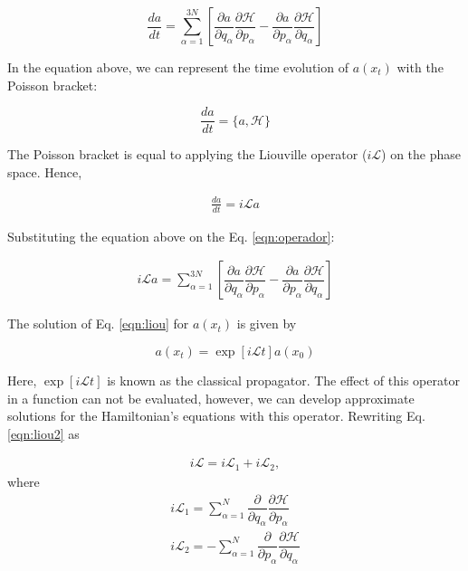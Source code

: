 \begin{equation}
\frac{da}{dt} = \sum_{\alpha=1}^{3N} \left [ \dfrac{\partial a}{\partial q_{\alpha}} \dfrac{\partial \mathcal{H}}{\partial p_{\alpha}}  - \dfrac{\partial a}{\partial p_{\alpha}} \dfrac{\partial \mathcal{H}}{\partial q_{\alpha}} \right]
\label{eqn:operador}
\end{equation}

In the equation above, we can represent the time evolution of $a(x_{t})$ with  the Poisson bracket:

\begin{equation}
\frac{da}{dt} = \{a,\mathcal{H}\}
\end{equation}

The Poisson bracket is equal to applying the Liouville operator ($i\mathcal{L}$) on the phase space. Hence,

\begin{equation}
\begin{aligned}
\frac{da}{dt} = i\mathcal{L} a 
\end{aligned}
\label{eqn:liou}
\end{equation}

Substituting the equation above on the Eq. \ref{eqn:operador}:

\begin{equation}
\begin{aligned}
i\mathcal{L} a = \sum_{\alpha=1}^{3N} \left [ \dfrac{\partial a}{\partial q_{\alpha}} \dfrac{\partial \mathcal{H}}{\partial p_{\alpha}}  - \dfrac{\partial a}{\partial p_{\alpha}} \dfrac{\partial \mathcal{H}}{\partial q_{\alpha}} \right]
\label{eqn:liou2}
\end{aligned}
\end{equation}

The solution of Eq. \ref{eqn:liou} for $a(x_{t})$ is given by

\begin{equation}
a(x_{t}) = \exp [i\mathcal{L}t] a(x_{0})
\label{eqn:exactsol}
\end{equation}

Here, $\exp [i\mathcal{L}t]$ is known as the classical propagator. The effect of this operator in a function can not be evaluated, however, we can develop approximate solutions for the Hamiltonian's equations with this operator. Rewriting Eq. \ref{eqn:liou2} as

\begin{equation}
\begin{aligned}
i\mathcal{L}  =  i\mathcal{L}_{1} + i\mathcal{L}_{2},
\end{aligned}
\end{equation}
where
\begin{equation}
\begin{aligned}
i\mathcal{L}_{1} = \sum_{\alpha=1}^{N}  \dfrac{\partial }{\partial q_{\alpha}} \dfrac{\partial \mathcal{H}}{\partial p_{\alpha}}   \\
i\mathcal{L}_{2} = - \sum_{\alpha=1}^{N} \dfrac{\partial }{\partial p_{\alpha}} \dfrac{\partial \mathcal{H}}{\partial q_{\alpha}} 
\end{aligned}
\end{equation}

